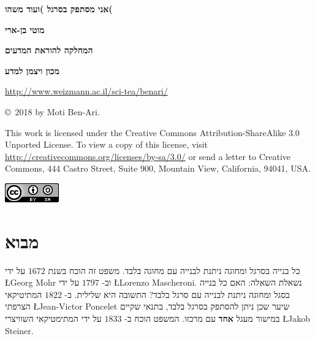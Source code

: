\documentclass[12pt,a4paper]{article}
\begin{document}
\thispagestyle{empty}


\begin{center}
\textbf{\Huge%
אני מסתפק בסרגל )ועוד משהו(
}

\bigskip
\bigskip
\bigskip
\bigskip

\textbf{\Large מוטי בן-ארי}

\bigskip

\textbf{\Large המחלקה להוראת המדעים}

\bigskip

\textbf{\Large מכון ויצמן למדע}

\bigskip

\url{http://www.weizmann.ac.il/sci-tea/benari/}
\end{center}

\bigskip
\bigskip
\bigskip
\bigskip

\begin{center}
\copyright{}\  2018 by Moti Ben-Ari.
\end{center}


{\small This work is licensed under the Creative Commons Attribution-ShareAlike 3.0 Unported License. To view a copy of this license, visit \url{http://creativecommons.org/licenses/by-sa/3.0/} or send a letter to Creative Commons, 444 Castro Street, Suite 900, Mountain View, California, 94041, USA.}

\bigskip

\begin{center}
\includegraphics[width=.2\textwidth]{../by-sa.png}
\end{center}


\newpage


\section{%
מבוא
}\label{s.intro}

כל בנייה בסרגל ומחוגה ניתנת לבנייה עם מחוגה בלבד. משפט זה הוכח בשנת 
$1672$
על ידי
\L{Georg Mohr}
וב-
$1797$
על ידי
\L{Lorenzo Mascheroni}.
נשאלת השאלה: האם כל בנייה בסגל ומחוגה ניתנת לבנייה עם סרגל בלבד? התשובה היא שלילית. ב-
$1822$
המתיטיקאי הצרפתי
\L{Jean-Victor Poncelet}
שיער שכן ניתן להסתפק בסרגל בלבד, בתנאי שקיים במישור מעגל
\textbf{%
אחד%
}
עם מרכזו. המשפט הוכח ב-
$1833$
על ידי המתימטיקאי השוויצרי
\L{Jakob Steiner}.
\end{document}
